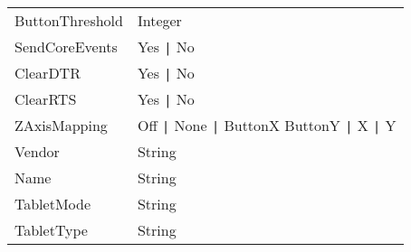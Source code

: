 \begin{tabular}[h]{|p{5cm}|p{7cm}|}
 ButtonThreshold  & Integer                            \\
 SendCoreEvents   & Yes \verb+|+ No                    \\
 ClearDTR         & Yes \verb+|+ No                    \\
 ClearRTS         & Yes \verb+|+ No                    \\
 ZAxisMapping     & Off \verb+|+ None \verb+|+ ButtonX ButtonY \verb+|+ X \verb+|+ Y \\
 Vendor           & String                             \\
 Name             & String                             \\
 TabletMode       & String                             \\
 TabletType       & String                             \\
 \hline
\end{tabular}

